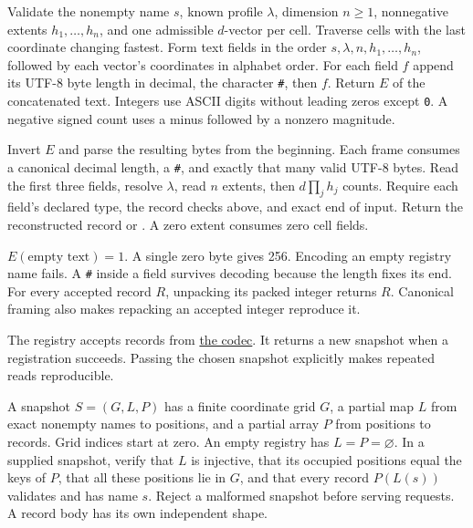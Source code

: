 Validate the nonempty name $s$, known profile $\lambda$, dimension $n\geq1$, nonnegative extents $h_1,\ldots,h_n$, and one admissible $d$-vector per cell. Traverse cells with the last coordinate changing fastest. Form text fields in the order $s,\lambda,n,h_1,\ldots,h_n$, followed by each vector's coordinates in alphabet order. For each field $f$ append its UTF-8 byte length in decimal, the character \texttt{\#}, then $f$. Return $E$ of the concatenated text. Integers use ASCII digits without leading zeros except \texttt{0}. A negative signed count uses a minus followed by a nonzero magnitude.

Invert $E$ and parse the resulting bytes from the beginning. Each frame consumes a canonical decimal length, a \texttt{\#}, and exactly that many valid UTF-8 bytes. Read the first three fields, resolve $\lambda$, read $n$ extents, then $d\prod_j h_j$ counts. Require each field's declared type, the record checks above, and exact end of input. Return the reconstructed record or . A zero extent consumes zero cell fields.

$E(\text{empty text})=1$. A single zero byte gives 256. Encoding an empty registry name fails. A \texttt{\#} inside a field survives decoding because the length fixes its end. For every accepted record $R$, unpacking its packed integer returns $R$. Canonical framing also makes repacking an accepted integer reproduce it.
\endgroup

\label{sos-impl-two}
\begingroup\small\raggedright
The registry accepts records from \hyperlink{impl-1}{the codec}. It returns a new snapshot when a registration succeeds. Passing the chosen snapshot explicitly makes repeated reads reproducible.

A snapshot $S=(G,L,P)$ has a finite coordinate grid $G$, a partial map $L$ from exact nonempty names to positions, and a partial array $P$ from positions to records. Grid indices start at zero. An empty registry has $L=P=\varnothing$. In a supplied snapshot, verify that $L$ is injective, that its occupied positions equal the keys of $P$, that all these positions lie in $G$, and that every record $P(L(s))$ validates and has name $s$. Reject a malformed snapshot before serving requests. A record body has its own independent shape.


